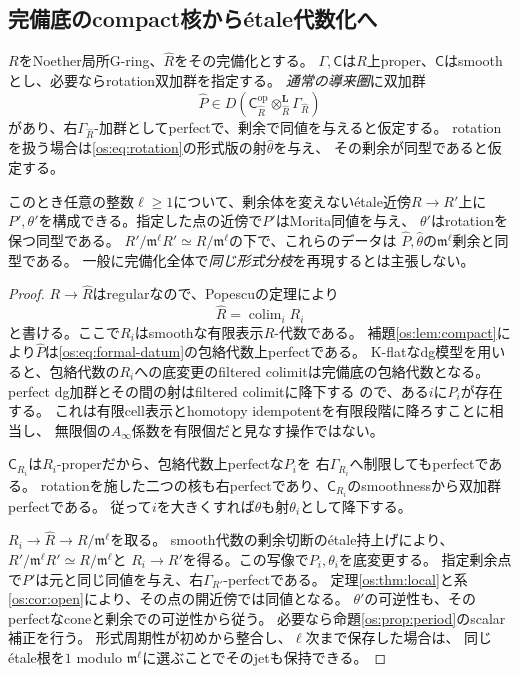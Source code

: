 \subsection{完備底のcompact核から\'etale代数化へ}

\begin{theorem}[片側compactな形式核の代数化]\label{os:thm:algebraization}
$R$をNoether局所G-ring、$\widehat R$をその完備化とする。
$\Gamma,\mathsf C$は$R$上proper、$\mathsf C$はsmoothとし、必要ならrotation双加群を指定する。
\emph{通常の導来圏}に双加群
\[
 \widehat P\in D(\mathsf C_{\widehat R}^{\mathrm{op}}
                    \otimes_{\widehat R}^{\mathbf L}\Gamma_{\widehat R})
 \tag{OS6}\label{os:eq:formal-datum}
\]
があり、右$\Gamma_{\widehat R}$-加群としてperfectで、剰余で同値を与えると仮定する。
rotationを扱う場合は\eqref{os:eq:rotation}の形式版の射$\widehat\theta$を与え、
その剰余が同型であると仮定する。

このとき任意の整数$\ell\ge1$について、剰余体を変えない\'etale近傍$R\to R'$上に
$P',\theta'$を構成できる。指定した点の近傍で$P'$はMorita同値を与え、
$\theta'$はrotationを保つ同型である。
$R'/\mathfrak m^\ell R'\simeq R/\mathfrak m^\ell$の下で、これらのデータは
$\widehat P,\widehat\theta$の$\mathfrak m^\ell$剰余と同型である。
一般に完備化全体で\emph{同じ形式分枝}を再現するとは主張しない。
\end{theorem}
\begin{proof}
$R\to\widehat R$はregularなので、Popescuの定理により
\[
 \widehat R=\mathop{\mathrm{colim}}_i R_i
 \tag{OS7}\label{os:eq:popescu}
\]
と書ける。ここで$R_i$はsmoothな有限表示$R$-代数である\cite[Tag~07GC]{OSPopescu}。
補題\ref{os:lem:compact}により$\widehat P$は\eqref{os:eq:formal-datum}の包絡代数上perfectである。
K-flatなdg模型を用いると、包絡代数の$R_i$への底変更のfiltered colimitは完備底の包絡代数となる。
perfect dg加群とその間の射はfiltered colimitに降下する
\cite[Lemma~2.10]{OSTV}ので、ある$i$に$P_i$が存在する。
これは有限cell表示とhomotopy idempotentを有限段階に降ろすことに相当し、
無限個の$A_\infty$係数を有限個だと見なす操作ではない。

$\mathsf C_{R_i}$は$R_i$-properだから、包絡代数上perfectな$P_i$を
右$\Gamma_{R_i}$へ制限してもperfectである。
rotationを施した二つの核も右perfectであり、$\mathsf C_{R_i}$のsmoothnessから双加群perfectである。
従って$i$を大きくすれば$\widehat\theta$も射$\theta_i$として降下する。

$R_i\to\widehat R\to R/\mathfrak m^\ell$を取る。
smooth代数の剰余切断の\'etale持上げ\cite[Tag~07M7]{OSEtale}により、
$R'/\mathfrak m^\ell R'\simeq R/\mathfrak m^\ell$と
$R_i\to R'$を得る。この写像で$P_i,\theta_i$を底変更する。
指定剰余点で$P'$は元と同じ同値を与え、右$\Gamma_{R'}$-perfectである。
定理\ref{os:thm:local}と系\ref{os:cor:open}により、その点の開近傍では同値となる。
$\theta'$の可逆性も、そのperfectなconeと剰余での可逆性から従う。
必要なら命題\ref{os:prop:period}のscalar補正を行う。
形式周期性が初めから整合し、$\ell$次まで保存した場合は、
同じ\'etale根を$1$ modulo $\mathfrak m^\ell$に選ぶことでそのjetも保持できる。
\end{proof}

